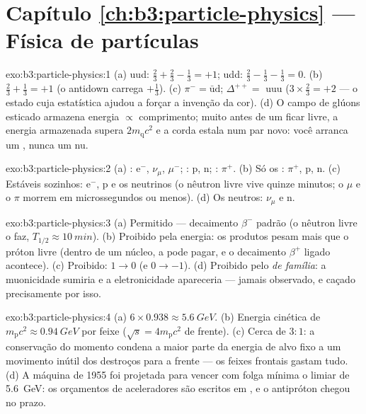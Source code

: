 \section*{Capítulo \ref{ch:b3:particle-physics} --- Física de partículas}

\begin{solution}{exo:b3:particle-physics:1}
(a) uud: $\tfrac23 + \tfrac23 - \tfrac13 = +1$; udd: $\tfrac23 -
\tfrac13 - \tfrac13 = 0$. (b) $\tfrac23 + \tfrac13 = +1$ (o
antidown carrega $+\tfrac13$). (c) $\pi^- =
\bar{\text{u}}\text{d}$; $\Delta^{++} = $ uuu ($3\times\tfrac23 =
+2$ --- o estado cuja estatística ajudou a forçar a invenção da
cor). (d) O campo de glúons esticado armazena energia
$\propto$ comprimento; muito antes de um  ficar livre, a energia
armazenada supera $2m_{\text{q}}c^2$ e a corda estala num par
novo: você arranca um , nunca um  nu.
\end{solution}

\begin{solution}{exo:b3:particle-physics:2}
(a) : e$^-$, $\nu_\mu$, $\mu^-$; : p, n; :
$\pi^+$. (b) Só os : $\pi^+$, p, n. (c) Estáveis sozinhos:
e$^-$, p e os neutrinos (o nêutron livre vive quinze
minutos; o $\mu$ e o $\pi$ morrem em microssegundos ou menos). (d) Os
neutros: $\nu_\mu$ e n.
\end{solution}

\begin{solution}{exo:b3:particle-physics:3}
(a) Permitido --- decaimento $\beta^-$ padrão (o nêutron livre o
faz, $T_{1/2} \approx \qty{10}{min}$). (b) Proibido pela energia:
os produtos pesam mais que o próton livre (dentro de um núcleo, a  pode pagar, e o decaimento $\beta^+$ ligado acontece). (c)
Proibido:  $1 \to 0$ (e 
$0 \to -1$). (d) Proibido pelo  \emph{de família}:
a muonicidade sumiria e a eletronicidade apareceria --- jamais
observado, e caçado precisamente por isso.
\end{solution}

\begin{solution}{exo:b3:particle-physics:4}
(a) $6\times0.938 \approx \qty{5.6}{GeV}$. (b) Energia cinética de
$m_{\text{p}}c^2 \approx \qty{0.94}{GeV}$ por feixe
($\sqrt s = 4m_{\text{p}}c^2$ de frente). (c) Cerca de $3:1$:
a conservação do momento condena a maior parte da energia de alvo fixo a
um movimento inútil dos destroços para a frente --- os feixes frontais
gastam tudo. (d) A máquina de 1955 foi projetada para vencer com folga
mínima o limiar de \qty{5.6}{GeV}: os orçamentos de aceleradores são
escritos em , e o antipróton chegou no prazo.
\end{solution}


